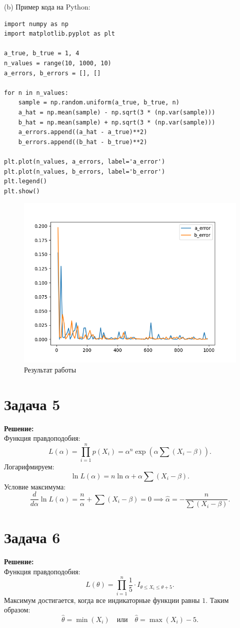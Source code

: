 \documentclass{article}
\begin{document}
(b) Пример кода на Python:
\begin{verbatim}
import numpy as np
import matplotlib.pyplot as plt

a_true, b_true = 1, 4
n_values = range(10, 1000, 10)
a_errors, b_errors = [], []

for n in n_values:
    sample = np.random.uniform(a_true, b_true, n)
    a_hat = np.mean(sample) - np.sqrt(3 * (np.var(sample)))
    b_hat = np.mean(sample) + np.sqrt(3 * (np.var(sample)))
    a_errors.append((a_hat - a_true)**2)
    b_errors.append((b_hat - b_true)**2)

plt.plot(n_values, a_errors, label='a_error')
plt.plot(n_values, b_errors, label='b_error')
plt.legend()
plt.show()
\end{verbatim}

\begin{figure}
    \centering
    \includegraphics{plot.png}
    \caption{Результат работы}
\end{figure}

\section*{Задача 5}
\noindent \textbf{Решение:} \\
Функция правдоподобия:
\[
L(\alpha) = \prod\limits_{i=1}^{n}p(X_{i}) = \alpha^n \exp\left(\alpha \sum (X_i - \beta)\right).
\]
Логарифмируем:
\[
\ln L(\alpha) = n \ln \alpha + \alpha \sum (X_i - \beta).
\]
Условие максимума:
\[
\frac{d}{d\alpha} \ln L(\alpha) = \frac{n}{\alpha} + \sum (X_i - \beta) = 0 \implies \hat{\alpha} = -\frac{n}{\sum (X_i - \beta)}.
\]

\section*{Задача 6}
\noindent \textbf{Решение:} \\
Функция правдоподобия:
\[
L(\theta) = \prod_{i=1}^n \frac{1}{5} \cdot I_{\theta \leq X_i \leq \theta + 5}.
\]
Максимум достигается, когда все индикаторные функции равны \(1\). Таким образом:
\[
\hat{\theta} = \min(X_i) \quad \text{или} \quad \hat{\theta} = \max(X_i) - 5.
\]
\end{document}
